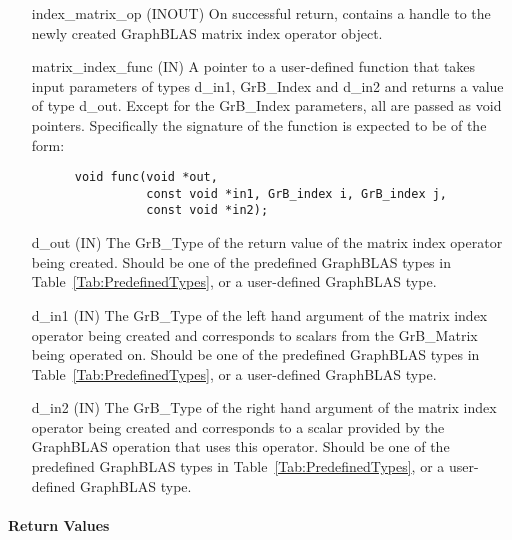 \begin{itemize}[leftmargin=1.1in]
    \item[{\sf index\_matrix\_op}] ({\sf INOUT}) On successful return, contains a 
          handle to the newly created GraphBLAS matrix index operator object.
    \item[{\sf matrix\_index\_func}] ({\sf IN}) A pointer to a user-defined function that 
          takes input parameters of types {\sf d\_in1}, {\sf GrB\_Index} and {\sf d\_in2}
          and returns a value of type {\sf d\_out}.  Except for the {\sf GrB\_Index}
          parameters, all are  passed as {\sf void} pointers.
          Specifically the signature of the function is expected to 
          be of the form:
      \begin{verbatim}
      void func(void *out,
                const void *in1, GrB_index i, GrB_index j, 
                const void *in2);
      \end{verbatim}
    \item[{\sf d\_out}]  ({\sf IN}) The {\sf GrB\_Type} of the return
          value of the matrix index operator being created. Should be one of the
          predefined GraphBLAS types in Table~\ref{Tab:PredefinedTypes}, or a 
          user-defined GraphBLAS type.
    \item[{\sf d\_in1}]  ({\sf IN}) The {\sf GrB\_Type} of the left hand 
          argument of the matrix index operator being created and corresponds to scalars 
          from the {\sf GrB\_Matrix} being operated on. Should be one of the
          predefined GraphBLAS types in Table~\ref{Tab:PredefinedTypes}, or a
          user-defined GraphBLAS type.
    \item[{\sf d\_in2}]  ({\sf IN}) The {\sf GrB\_Type} of the right hand 
          argument of the matrix index operator being created and corresponds to a
          scalar provided by the GraphBLAS operation that uses this operator. Should be one of the
          predefined GraphBLAS types in Table~\ref{Tab:PredefinedTypes}, or a 
          user-defined GraphBLAS type.
\end{itemize}

\paragraph{Return Values}

